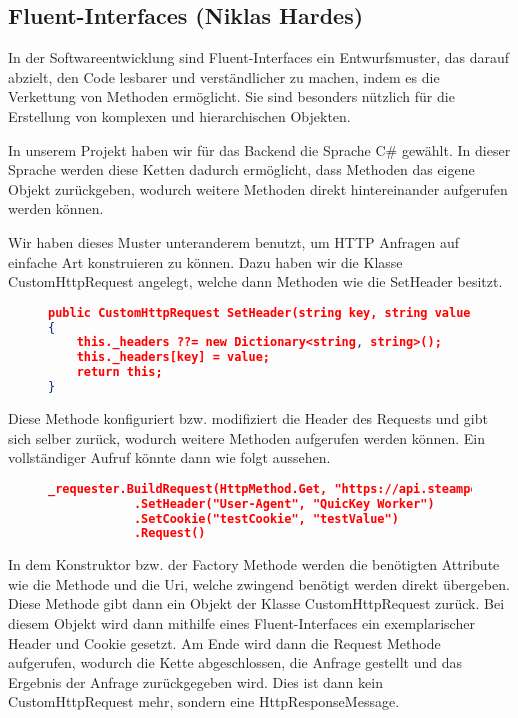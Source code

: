\subsection*{Fluent-Interfaces (Niklas Hardes)}

In der Softwareentwicklung sind Fluent-Interfaces ein Entwurfsmuster, das darauf abzielt, den Code lesbarer und verständlicher zu machen, indem es die Verkettung von Methoden ermöglicht. Sie sind besonders nützlich für die Erstellung von komplexen und hierarchischen Objekten.

In unserem Projekt haben wir für das Backend die Sprache C\# gewählt. In dieser Sprache werden diese Ketten dadurch ermöglicht, dass Methoden das eigene Objekt zurückgeben, wodurch weitere Methoden direkt hintereinander aufgerufen werden können.

Wir haben dieses Muster unteranderem benutzt, um HTTP Anfragen auf einfache Art konstruieren zu können.
Dazu haben wir die Klasse CustomHttpRequest angelegt, welche dann Methoden wie die SetHeader besitzt.

\begin{figure}[bht]
\begin{lstlisting}[caption=Codeausschnitt von CustomHttpRequest (1),language=json]
public CustomHttpRequest SetHeader(string key, string value)
{
    this._headers ??= new Dictionary<string, string>();
    this._headers[key] = value;
    return this;
}
\end{lstlisting}
\end{figure}

Diese Methode konfiguriert bzw. modifiziert die Header des Requests und gibt sich selber zurück, wodurch weitere Methoden aufgerufen werden können. Ein vollständiger Aufruf könnte dann wie folgt aussehen.

\begin{figure}[bht]
\begin{lstlisting}[caption=Codeausschnitt von CustomHttpRequest (2),language=json]
_requester.BuildRequest(HttpMethod.Get, "https://api.steampowered.com/ISteamApps/GetAppList/v2/")
            .SetHeader("User-Agent", "QuicKey Worker")
            .SetCookie("testCookie", "testValue")
            .Request()
\end{lstlisting}
\end{figure}

In dem Konstruktor bzw. der Factory Methode werden die benötigten Attribute wie die Methode und die Uri, welche zwingend benötigt werden direkt übergeben. Diese Methode gibt dann ein Objekt der Klasse CustomHttpRequest zurück. Bei diesem Objekt wird dann mithilfe eines Fluent-Interfaces ein exemplarischer Header und Cookie gesetzt. Am Ende wird dann die Request Methode aufgerufen, wodurch die Kette abgeschlossen, die Anfrage gestellt und das Ergebnis der Anfrage zurückgegeben wird. Dies ist dann kein CustomHttpRequest mehr, sondern eine HttpResponseMessage.
